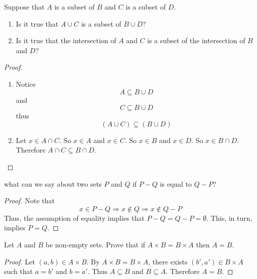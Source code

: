 \begin{exercise} \label{0.13}
	Suppose that $A$ is a subset of $B$ and $C$ is a subset of $D$.
	
	\begin{enumerate}[label=(\alph*)]
	    \item Is it true that $A \cup C$ is a subset of $B \cup D$?
	    \item Is it true that the intersection of $A$ and $C$ is a subset of the intersection of $B$ and $D$?
	\end{enumerate}
	
	\begin{proof}
	    \begin{enumerate}[label=(\alph*)]
	        \item Notice
	        $$ A \subseteq B \cup D $$
	        and
	        $$ C \subseteq B \cup D $$
	        thus
	        $$ (A \cup C) \subseteq (B \cup D) $$
	        
	        \item Let $x \in A \cap C$. So $x \in A$ and $x \in C$. So $x \in B$ and $x \in D$. So $x \in B \cap D$. Therefore $A \cap C \subseteq B \cap D$.
	    \end{enumerate}
	\end{proof}
\end{exercise}

\begin{exercise} \label{0.14}
	what can we say about two sets $P$ and $Q$ if $P - Q$ is equal to $Q - P$?
	
	\begin{proof}
	    Note that
	    $$ x \in P-Q \Rightarrow  x \not\in Q \Rightarrow x \not\in Q-P $$
	    Thus, the assumption of equality implies that $P-Q=Q-P=\emptyset$. This, in turn, implies $P=Q$.
	\end{proof}
\end{exercise}

\begin{exercise} \label{0.15}
	Let $A$ and $B$ be non-empty sets. Prove that if $A \times B = B \times A$ then $A=B$.
	
	\begin{proof}
	    Let $(a,b) \in A \times B$. By $A \times B = B \times A$, there exists $(b',a') \in B \times A$ such that $a=b'$ and $b=a'$. Thus $A \subseteq B$ and $B \subseteq A$. Therefore $A=B$.
	\end{proof}
\end{exercise}

